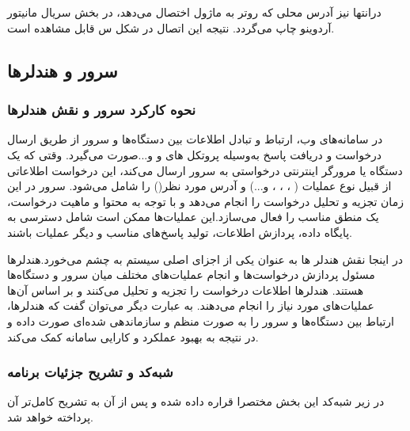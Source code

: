 \section*{}
\begin{latin}
	
\end{latin}


درانتها نیز آدرس محلی
\noindent\unskip{}
که روتر به ماژول اختصال می‌دهد، در بخش سریال مانیتور
\noindent\unskip{}
آردوینو چاپ می‌گردد. نتیجه این اتصال در شکل س قابل مشاهده است.
\newpage
\subsection{سرور و هندلر‌‌ها }
\subsubsection{نحوه کارکرد سرور و نقش هندلر‌ها}
در سامانه‌های وب، ارتباط و تبادل اطلاعات بین دستگاه‌ها و سرور
\noindent\unskip{}
از طریق ارسال درخواست‌
\noindent\unskip{}
و دریافت پاسخ‌
\noindent\unskip{}
به‌وسیله پروتکل های  و  و...‌صورت می‌گیرد. وقتی که یک دستگاه یا مرورگر اینترنتی درخواستی به سرور ارسال می‌کند، این درخواست اطلاعاتی از قبیل نوع عملیات  ( ، ،  ،  و...) و آدرس مورد نظر()
\noindent\unskip{}
را شامل می‌شود. سرور در این زمان تجزیه و تحلیل درخواست را انجام می‌دهد و با توجه به محتوا و ماهیت درخواست، یک منطق مناسب را فعال می‌سازد.این عملیات‌ها ممکن است شامل دسترسی به پایگاه داده، پردازش اطلاعات، تولید پاسخ‌های مناسب و دیگر عملیات باشند.

در اینجا نقش هندلر
\noindent\unskip{}
ها به عنوان یکی از اجزای اصلی سیستم به چشم می‌خورد.هندلرها مسئول پردازش درخواست‌ها و انجام عملیات‌های مختلف میان سرور و دستگاه‌ها هستند. هندلرها اطلاعات درخواست را تجزیه و تحلیل می‌کنند و بر اساس آن‌ها عملیات‌های مورد نیاز را انجام می‌دهند. به عبارت دیگر می‌توان گفت که هندلرها، ارتباط بین دستگاه‌ها و سرور را به صورت منظم و سازماندهی شده‌ای صورت داده و در نتیجه به بهبود عملکرد و کارایی سامانه کمک می‌کند. 

\subsubsection{شبه‌کد و تشریح جزئیات برنامه }
در زیر شبه‌کد
\noindent\unskip{}
این بخش مختصرا قراره داده شده و پس از آن به تشریح کامل‌تر آن پرداخته خواهد شد.

